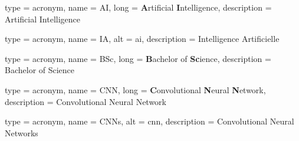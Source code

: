 



{
    type        = {acronym},
    name        = {AI},
    long        = {\textbf{A}rtificial \textbf{I}ntelligence},
    description = {Artificial Intelligence}
}

{
    type        = {acronym},
    name        = {IA},
    alt         = {ai},
    description = {Intelligence Artificielle}
}

{
    type        = {acronym},
    name        = {BSc},
    long        = {\textbf{B}achelor of \textbf{Sc}ience},
    description = {Bachelor of Science}
}

{
    type        = {acronym},
    name        = {CNN},
    long        = {\textbf{C}onvolutional \textbf{N}eural \textbf{N}etwork},
    description = {Convolutional Neural Network}
}

{
    type        = {acronym},
    name        = {CNNs},
    alt         = {cnn},
    description = {Convolutional Neural Networks}
}

